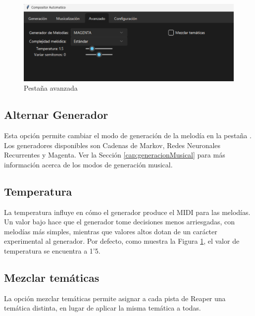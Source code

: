 \begin{figure}[h]
    \begin{center}
        \includegraphics[scale=0.7]{Imagenes/Bitmap/advancedTab.png}
    \end{center}
    \caption{Pestaña avanzada}
    \label{fig:advancedTab}
\end{figure}

\subsection{Alternar Generador}
\label{subsec:app:alternarGenerador}
Esta opción permite cambiar el modo de generación de la melodía en la pestaña \generationTabName{}. Los generadores disponibles son Cadenas de Markov, Redes Neuronales Recurrentes y Magenta. Ver la Sección \ref{cap:generacionMusical} para más información acerca de los modos de generación musical. 

\subsection{Temperatura}
\label{subsec:app:temperature}
La temperatura influye en cómo el generador produce el MIDI para las melodías. Un valor bajo hace que el generador tome decisiones menos arriesgadas, con melodías más simples, mientras que valores altos dotan de un carácter experimental al generador. Por defecto, como muestra la Figura \ref{fig:advancedTab}, el valor de temperatura se encuentra a 1'5.

\subsection{Mezclar temáticas}
\label{subsec:app:mixThemes}

La opción mezclar temáticas permite asignar a cada pista de Reaper una temática distinta, en lugar de aplicar la misma temática a todas.

